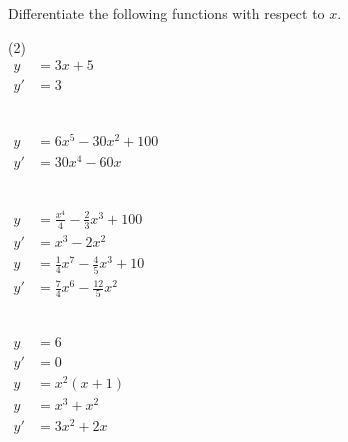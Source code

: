 \begin{solution}
    Differentiate the following functions with respect to $x$.
    \begin{tasks}[after-item-skip=10pt](2)
        \task \\
              $ \begin{aligned} y &=3x+5 \\
                               y' &=3
                \end{aligned} $  
              
        \task \\
              $ \begin{aligned}  y &=6x^5-30x^2+100   \\
               y' &=30x^4-60x 
              \end{aligned} $ 
              
         \task \\
              $ \begin{aligned} y&=\displaystyle \frac{x^4}{4} -  \displaystyle \frac{2}{3}x^3+100 \\
                                y'&=x^3 - 2x^2 
                \end{aligned} $
        \task \\
              $ \begin{aligned}  y&=\displaystyle \frac{1}{4}x^7 - \displaystyle \frac{4}{5}x^3+10 \\
                                y'&=\displaystyle \frac{7}{4}x^6 - \displaystyle \frac{12}{5}x^2
              \end{aligned} $

        \task \\
              $ \begin{aligned} y &=6 \\
                               y' &=0
                \end{aligned} $ 
        \task \\
              $ \begin{aligned} y &= x^2(x+1)\\
                                y &= x^3 + x^2 \\
                                y' &=3x^2 +2x
                \end{aligned} $                        
                                                
    \end{tasks}
\end{solution}


